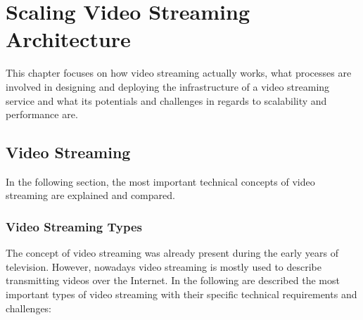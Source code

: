 \chapter{Scaling Video Streaming Architecture}\label{chapter:videostreaming}

This chapter focuses on how video streaming actually works, what processes are involved in designing and deploying the infrastructure of a video streaming service and what its potentials and challenges in regards to scalability and performance are.   

\section{Video Streaming}

In the following section, the most important technical concepts of video streaming are explained and compared.

\subsection{Video Streaming Types}
The concept of video streaming was already present during the early years of television. However, nowadays video streaming is mostly used to describe transmitting videos over the Internet. In the following are described the most important types of video streaming with their specific technical requirements and challenges:

